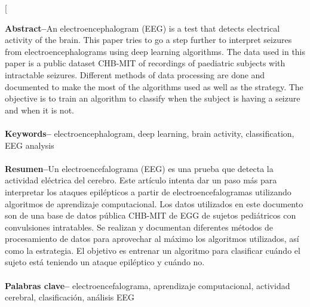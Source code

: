 ﻿\documentclass[10pt,a4paper,twocolumn,twoside]{article}
\begin{document}
\twocolumn[\begin{@twocolumnfalse}


\maketitle

\thispagestyle{primerapagina}
\begin{center}
\parbox{0.915\textwidth}
{\sffamily
\textbf{Abstract--}An electroencephalogram (EEG) is a test that detects electrical activity of the brain. This paper tries to go a step further to interpret seizures from electroencephalograms using deep learning algorithms. The data used in this paper is a public dataset CHB-MIT\cite{bbddCHBMIT} of recordings of paediatric subjects with intractable seizures. Different methods of data processing are done and documented to make the most of the algorithms used as well as the strategy. The objective is to train an algorithm to classify when the subject is having a seizure and when it is not.
\\
\\
\textbf{Keywords-- }electroencephalogram, deep learning, brain activity, classification, EEG analysis\\
\bigskip
\\
\textbf{Resumen--}Un electroencefalograma (EEG) es una prueba que detecta la actividad eléctrica del cerebro. Este artículo intenta dar un paso más para interpretar los ataques epilépticos a partir de electroencefalogramas utilizando algoritmos de aprendizaje computacional. Los datos utilizados en este documento son de una base de datos pública CHB-MIT\cite{bbddCHBMIT} de EGG de sujetos pediátricos con convulsiones intratables. Se realizan y documentan diferentes métodos de procesamiento de datos para aprovechar al máximo los algoritmos utilizados, así como la estrategia. El objetivo es entrenar un algoritmo para clasificar cuándo el sujeto está teniendo un ataque epiléptico y cuándo no.
\\
\\
\textbf{Palabras clave-- }electroencefalograma, aprendizaje computacional, actividad cerebral, clasificación, análisis EEG\\
}


\end{center}
\end{@twocolumnfalse}
\end{document}
